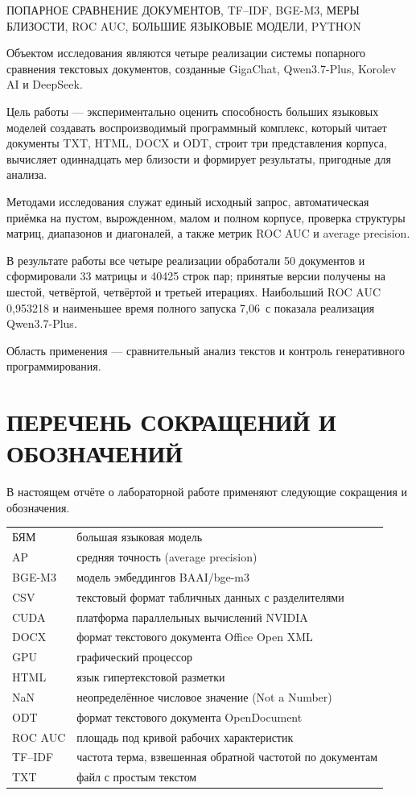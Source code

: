 \documentclass[a4paper,12pt]{extreport}
\begin{document}
{\noindent\raggedright{}\relax
ПОПАРНОЕ СРАВНЕНИЕ ДОКУМЕНТОВ, TF--IDF, BGE-M3, МЕРЫ БЛИЗОСТИ, ROC AUC, БОЛЬШИЕ ЯЗЫКОВЫЕ МОДЕЛИ, PYTHON\par}

Объектом исследования являются четыре реализации системы попарного сравнения текстовых документов, созданные GigaChat, Qwen3.7-Plus, Korolev AI и DeepSeek.

Цель работы --- экспериментально оценить способность больших языковых моделей создавать воспроизводимый программный комплекс, который читает документы TXT, HTML, DOCX и ODT, строит три представления корпуса, вычисляет одиннадцать мер близости и формирует результаты, пригодные для анализа.

Методами исследования служат единый исходный запрос, автоматическая приёмка на пустом, вырожденном, малом и полном корпусе, проверка структуры матриц, диапазонов и диагоналей, а также метрик ROC AUC и average precision.

В результате работы все четыре реализации обработали 50 документов и сформировали 33 матрицы и 40425 строк пар; принятые версии получены на шестой, четвёртой, четвёртой и третьей итерациях. Наибольший ROC AUC 0,953218 и наименьшее время полного запуска 7,06~с показала реализация Qwen3.7-Plus.

Область применения --- сравнительный анализ текстов и контроль генеративного программирования.

\clearpage

\tableofcontents
\clearpage

\chapter*{ПЕРЕЧЕНЬ СОКРАЩЕНИЙ И ОБОЗНАЧЕНИЙ}

В настоящем отчёте о лабораторной работе применяют следующие сокращения и обозначения.

\noindent
\begin{tabularx}{\linewidth}{@{}l@{\quad---\quad}X@{}}
БЯМ & большая языковая модель \\
AP & средняя точность (average precision) \\
BGE-M3 & модель эмбеддингов BAAI/bge-m3 \\
CSV & текстовый формат табличных данных с разделителями \\
CUDA & платформа параллельных вычислений NVIDIA \\
DOCX & формат текстового документа Office Open XML \\
GPU & графический процессор \\
HTML & язык гипертекстовой разметки \\
NaN & неопределённое числовое значение (Not a Number) \\
ODT & формат текстового документа OpenDocument \\
ROC AUC & площадь под кривой рабочих характеристик \\
TF--IDF & частота терма, взвешенная обратной частотой по документам \\
TXT & файл с простым текстом
\end{tabularx}
\end{document}
